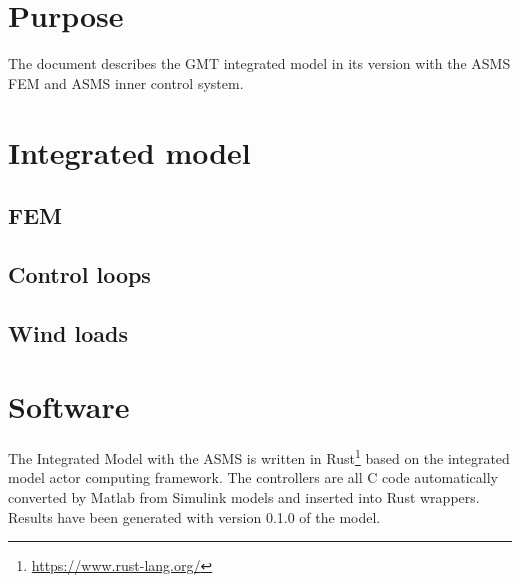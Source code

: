 \documentclass{gmto}
\begin{document}
\section{Purpose}
\label{sec:purpose}

The document describes the GMT integrated model in its version with the ASMS FEM
and ASMS inner control system.


\section{Integrated model}


\subsection{FEM}
\label{sec:fem}



\clearpage
\subsection{Control loops}
\label{sec:ctrlr}






\subsection{Wind loads}
\label{sec:wind-loads}



\appendix

\section{Software}
\label{sec:software}

The Integrated Model with the ASMS\cite{asms_im} is written in Rust\footnote{\url{https://www.rust-lang.org/}} based on
the integrated model actor computing framework\cite{dos_actors}.
The controllers are all C code automatically converted by Matlab from Simulink
models and inserted into Rust wrappers.
Results have been generated with version 0.1.0 of the model.
\end{document}
